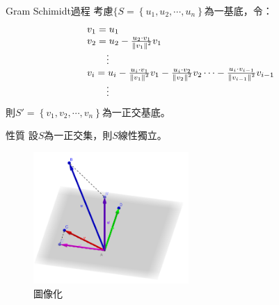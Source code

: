 \documentclass[14pt]{beamer}
\begin{document}
\begin{frame}{Gram Schimidt過程}
	考慮$\mathrm{\{}$$S=\left\{u_{1} ,u_{2} ,\cdots ,u_{n} \right\}$為一基底，令：\[\begin{array}{l} {v_{1} =u_{1} } \\ {v_{2} =u_{2} -\frac{u_{2} \cdot v_{1} }{\left\| v_{1} \right\| ^{2} } v_{1} } \\ {\qquad \vdots } \\ {v_{i} =u_{i} -\frac{u_{i} \cdot v_{1} }{\left\| v_{1} \right\| ^{2} } v_{1} -\frac{u_{i} \cdot v_{2} }{\left\| v_{2} \right\| ^{2} } v_{2} \cdots -\frac{u_{i} \cdot v_{i{\rm -1}} }{\left\| v_{i{\rm -1}} \right\| ^{2} } v_{i{\rm -1}} } \\ {\qquad \vdots } \end{array}\] 
	則$S{'} =\left\{v_{1} ,v_{2} ,\cdots ,v_{n} \right\}$為一正交基底。
	
\end{frame}
\begin{frame}[fragile]{性質}
	設$S$為一正交集，則$S$線性獨立。
	\begin{figure}[H]
		\centering
		\includegraphics[height=5cm]{gramschmidt.png}
		\caption{圖像化}
		\label{fig:gram-schmidt}
	\end{figure}
\end{frame}
\end{document}
